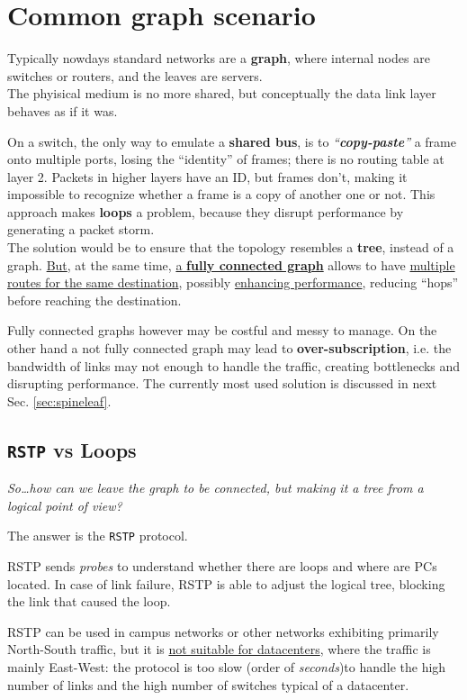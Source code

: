 \section{Common graph scenario}
Typically nowdays standard networks are a \textbf{graph}, where internal nodes are switches or routers, and the leaves are servers.\\
The phyisical medium is no more shared, but conceptually the data link layer behaves as if it was.

On a switch, the only way to emulate a \textbf{shared bus}, is to \textit{``\textbf{copy-paste}''} a frame onto multiple ports, losing the ``identity'' of frames; there is no routing table at layer 2. Packets in higher layers have an ID, but frames don't, making it impossible to recognize whether a frame is a copy of another one or not.
This approach makes \textbf{loops} a problem, because they disrupt performance by generating a packet storm.\\
The solution would be to ensure that the topology resembles a \textbf{tree}, instead of a graph.
\ul{But}, at the same time, \ul{a \textbf{fully connected graph}} allows to have \ul{multiple routes for the same destination}, possibly \ul{enhancing performance}, reducing ``hops'' before reaching the destination.

Fully connected graphs however may be costful and messy to manage.
On the other hand a not fully connected graph may lead to \textbf{over-subscription}, i.e. the bandwidth of links may not enough to handle the traffic, creating bottlenecks and disrupting performance.
The currently most used solution is discussed in next Sec. \ref{sec:spineleaf}.

\subsection{\texttt{RSTP} vs Loops}
\begin{center}
   \textit{So\dots how can we leave the graph to be connected, but making it a tree from a logical point of view?}

   The answer is the \texttt{RSTP} protocol.
\end{center}

RSTP sends \textit{probes} to understand whether there are loops and where are PCs located.
In case of link failure, RSTP is able to adjust the logical tree, blocking the link that caused the loop.

RSTP can be used in campus networks or other networks exhibiting primarily North-South traffic, but it is \ul{not suitable for datacenters}, where the traffic is mainly East-West:
the protocol is too slow (order of \textit{seconds})to handle the high number of links and the high number of switches typical of a datacenter.

